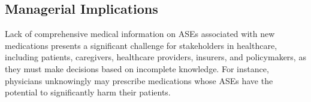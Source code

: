 \documentclass[referee,bst/sn-basic]{sn-jnl}%
\begin{document}

\subsection{Managerial Implications}
Lack of comprehensive medical information on ASEs associated with new medications presents a significant challenge for stakeholders in healthcare, including patients, caregivers, healthcare providers, insurers, and policymakers, as they must make decisions based on incomplete knowledge.
For instance, physicians unknowingly may prescribe medications whose ASEs have the potential to significantly harm their patients.
\end{document}
